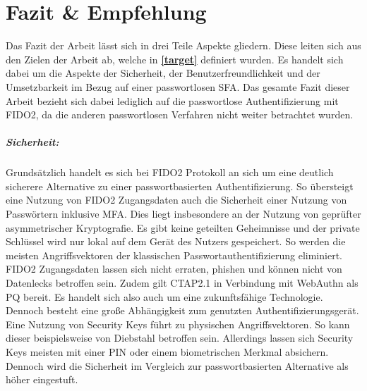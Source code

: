 

\chapter{Fazit \& Empfehlung}
Das Fazit der Arbeit lässt sich in drei Teile Aspekte gliedern. Diese leiten sich aus den Zielen der Arbeit ab, welche in \textbf{\ref{target}} definiert wurden. Es handelt sich dabei um die Aspekte der Sicherheit, der Benutzerfreundlichkeit und der Umsetzbarkeit im Bezug auf einer passwortlosen \ac{SFA}. Das gesamte Fazit dieser Arbeit bezieht sich dabei lediglich auf die passwortlose Authentifizierung mit FIDO2, da die anderen passwortlosen Verfahren nicht weiter betrachtet wurden.

\paragraph*{Sicherheit:} Grundsätzlich handelt es sich bei FIDO2 Protokoll an sich um eine deutlich sicherere Alternative zu einer passwortbasierten Authentifizierung. So übersteigt eine Nutzung von FIDO2 Zugangsdaten auch die Sicherheit einer Nutzung von Passwörtern inklusive \ac{MFA}. Dies liegt insbesondere an der Nutzung von geprüfter asymmetrischer Kryptografie. Es gibt keine geteilten Geheimnisse und der private Schlüssel wird nur lokal auf dem Gerät des Nutzers gespeichert. So werden die meisten Angriffsvektoren der klassischen Passwortauthentifizierung eliminiert. FIDO2 Zugangsdaten lassen sich nicht erraten, phishen und können nicht von Datenlecks betroffen sein. Zudem gilt CTAP2.1 in Verbindung mit WebAuthn als \ac{PQ} bereit. Es handelt sich also auch um eine zukunftsfähige Technologie. Dennoch besteht eine große Abhängigkeit zum genutzten Authentifizierungsgerät. Eine Nutzung von Security Keys führt zu physischen Angriffsvektoren. So kann dieser beispielsweise von Diebstahl betroffen sein. Allerdings lassen sich Security Keys meisten mit einer PIN oder einem biometrischen Merkmal absichern. Dennoch wird die Sicherheit im Vergleich zur passwortbasierten Alternative als höher eingestuft.

